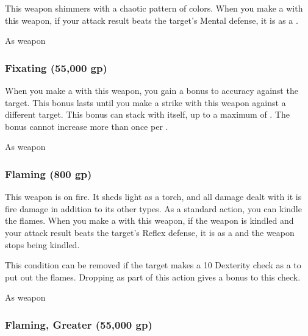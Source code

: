 This weapon shimmers with a chaotic pattern of colors.
When you make a  with this weapon, if your attack result beats the target's Mental defense, it is \disoriented as a .



 


 As weapon


\lowercase{\hypertarget{item:Fixating}{}}\label{item:Fixating}
\hypertarget{item:Fixating}{\subsubsection{Fixating\hfill{} (55,000 gp)}}

When you make a  with this weapon, you gain a  bonus to accuracy against the target.
This bonus lasts until you make a strike with this weapon against a different target.
This bonus can stack with itself, up to a maximum of .
The bonus cannot increase more than once per .



 As weapon


\lowercase{\hypertarget{item:Flaming}{}}\label{item:Flaming}
\hypertarget{item:Flaming}{\subsubsection{Flaming\hfill{} (800 gp)}}

This weapon is on fire.
It sheds light as a torch, and all damage dealt with it is fire damage in addition to its other types.
As a standard action, you can kindle the flames.
When you make a  with this weapon, if the weapon is kindled and your attack result beats the target's Reflex defense,
it is  as a  and the weapon stops being kindled.

This condition can be removed if the target makes a  10 Dexterity check as a  to put out the flames.
Dropping  as part of this action gives a  bonus to this check.



 


 As weapon


\lowercase{\hypertarget{item:Flaming, Greater}{}}\label{item:Flaming, Greater}
\hypertarget{item:Flaming, Greater}{\subsubsection{Flaming, Greater\hfill{} (55,000 gp)}}

